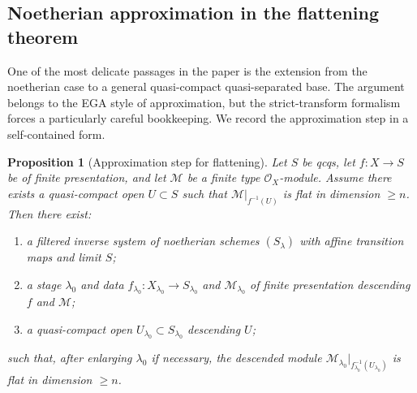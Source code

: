 \documentclass[11pt,oneside]{article}
\newtheorem{proposition}[theorem]{Proposition}
\newcommand{\M}{\mathcal M}
\newcommand{\OO}{\mathcal O}
\begin{document}
\subsection{Noetherian approximation in the flattening theorem}

One of the most delicate passages in the paper is the extension from the noetherian case to a general quasi-compact quasi-separated base.  The argument belongs to the EGA style of approximation, but the strict-transform formalism forces a particularly careful bookkeeping.  We record the approximation step in a self-contained form.

\begin{proposition}[Approximation step for flattening]\label{prop:approx-flattening}
Let $S$ be qcqs, let $f\colon X\to S$ be of finite presentation, and let $\M$ be a finite type $\OO_X$-module.  Assume there exists a quasi-compact open $U\subset S$ such that $\M|_{f^{-1}(U)}$ is flat in dimension $\ge n$.  Then there exist:
\begin{enumerate}[label=\textup{(\roman*)}]
  \item a filtered inverse system of noetherian schemes $(S_\lambda)$ with affine transition maps and limit $S$;
  \item a stage $\lambda_0$ and data $f_{\lambda_0}\colon X_{\lambda_0}\to S_{\lambda_0}$ and $\M_{\lambda_0}$ of finite presentation descending $f$ and $\M$;
  \item a quasi-compact open $U_{\lambda_0}\subset S_{\lambda_0}$ descending $U$;
\end{enumerate}
such that, after enlarging $\lambda_0$ if necessary, the descended module $\M_{\lambda_0}|_{f_{\lambda_0}^{-1}(U_{\lambda_0})}$ is flat in dimension $\ge n$.
\end{proposition}
\end{document}

